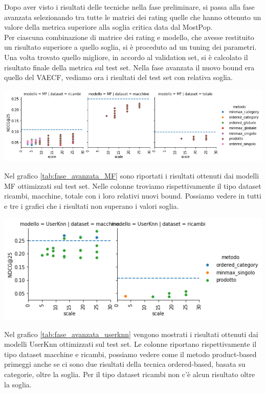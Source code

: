 Dopo aver visto i risultati delle tecniche nella fase preliminare, si passa alla fase avanzata selezionando tra tutte le matrici dei rating quelle che hanno ottenuto un valore della metrica superiore alla soglia critica data dal MostPop. \\
Per ciascuna combinazione di matrice dei rating e modello, che avesse restituito un risultato superiore a quello soglia, si è proceduto ad un tuning dei parametri. Una volta trovato quello migliore, in accordo al validation set, si è calcolato il risultato finale della metrica sul test set.
Nella fase avanzata il nuovo bound era quello del VAECF, vediamo ora i risultati del test set con relativa soglia.
\begin{center}
    \includegraphics[width=16cm]{figures/validazione_mf.png}
    \label{tab:fase_avanzata_MF}
\end{center}
Nel grafico \ref{tab:fase_avanzata_MF} sono riportati i risultati ottenuti dai modelli MF ottimizzati sul test set. Nelle colonne troviamo rispettivamente il tipo dataset ricambi, macchine, totale con i loro relativi nuovi bound. Possiamo vedere in tutti e tre i grafici che i risultati non superano i valori soglia.
\begin{center}
    \includegraphics[width=16cm]{figures/validazione_userknn.png}
    \label{tab:fase_avanzata_userknn}
\end{center}

Nel grafico \ref{tab:fase_avanzata_userknn} vengono mostrati i risultati ottenuti dai modelli UserKnn ottimizzati sul test set. Le colonne riportano rispettivamente il tipo dataset macchine e ricambi, possiamo vedere come il metodo product-based primeggi anche se ci sono due risultati della tecnica ordered-based, basata su categorie, oltre la soglia. Per il tipo dataset ricambi non c'è alcun risultato oltre la soglia.

